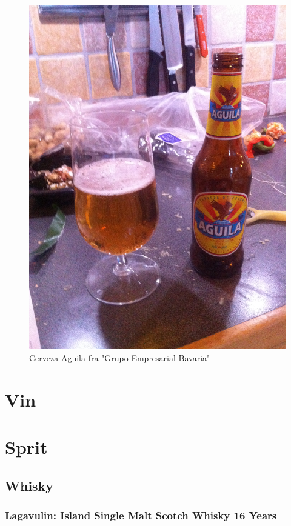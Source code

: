 \documentclass[12pt,a4paper,oneside,norsk]{article}
\begin{document}
\begin{figure} [H]
\centering
\includegraphics[scale=0.1, angle=270]{Bilder/OL/CervezaAguila.jpg}
\caption{Cerveza Aguila fra "Grupo Empresarial Bavaria"}
\end{figure}   

\newpage
\section{Vin}

\newpage
\section{Sprit}
\subsection{Whisky}
\subsubsection{Lagavulin: Island Single Malt Scotch Whisky 16 Years}
\end{document}
